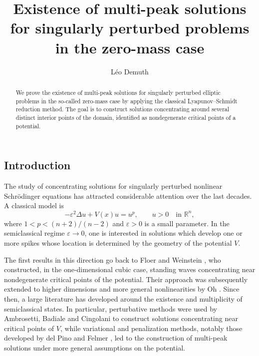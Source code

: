 \documentclass[12pt]{amsart}
\theoremstyle{plain}
\theoremstyle{definition}
\theoremstyle{remark}
\renewcommand{\epsilon}{\varepsilon}
\begin{document}
\title[Multi-peaks in the zero-mass case]{Existence of multi-peak solutions for singularly perturbed
problems in the zero-mass case}

\author{Léo Demuth}
\address{DER de mathématiques, ENS Paris-Saclay, Gif-sur-Yvette, France}




\begin{abstract}
We prove the existence of multi-peak solutions for singularly perturbed elliptic
problems in the so-called zero-mass case by applying the classical
Lyapunov–Schmidt reduction method. The goal is to construct solutions concentrating around
several distinct interior points of the domain, identified as nondegenerate critical points of a potential. 
\end{abstract}


\maketitle
{}

\setcounter{tocdepth}{2}
\tableofcontents

\begin{center}
\section{Introduction}
\end{center}

The study of concentrating solutions for singularly perturbed nonlinear
Schr\"odinger equations has attracted considerable attention over the last
decades. A classical model is
\begin{equation}\label{classicalNLS}
 -\epsilon^2\Delta u+V(x)u=u^p,\qquad
 u>0\quad\text{in }\mathbb{R}^n,
\end{equation}
where \(1<p<(n+2)/(n-2)\) and \(\epsilon>0\) is a small parameter.
In the semiclassical regime \(\epsilon\to0\), one is interested in
solutions which develop one or more spikes whose location is determined by
the geometry of the potential \(V\).

The first results in this direction go back to Floer and Weinstein
\cite{FloerWeinstein1986}, who constructed, in the one-dimensional cubic
case, standing waves concentrating near nondegenerate critical points of
the potential. Their approach was subsequently extended to higher
dimensions and more general nonlinearities by Oh \cite{Oh1988}. Since
then, a large literature has developed around the existence and
multiplicity of semiclassical states. In particular, perturbative methods
were used by Ambrosetti, Badiale and Cingolani
\cite{AmbrosettiBadialeCingolani1997} to construct solutions concentrating
near critical points of \(V\), while variational and penalization methods,
notably those developed by del Pino and Felmer \cite{delPinoFelmer1998},
led to the construction of multi-peak solutions under more general
assumptions on the potential.
\end{document}
